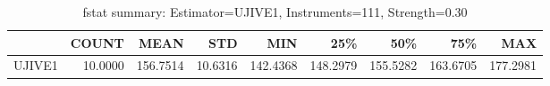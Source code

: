 \begin{table}[ht]
\centering
\caption{fstat summary: Estimator=UJIVE1, Instruments=111, Strength=0.30}
\begin{tabular}{lrrrrrrrr}
\toprule
 & COUNT & MEAN & STD & MIN & 25\% & 50\% & 75\% & MAX \\
\midrule
UJIVE1 & 10.0000 & 156.7514 & 10.6316 & 142.4368 & 148.2979 & 155.5282 & 163.6705 & 177.2981 \\
\bottomrule
\end{tabular}
\end{table}
